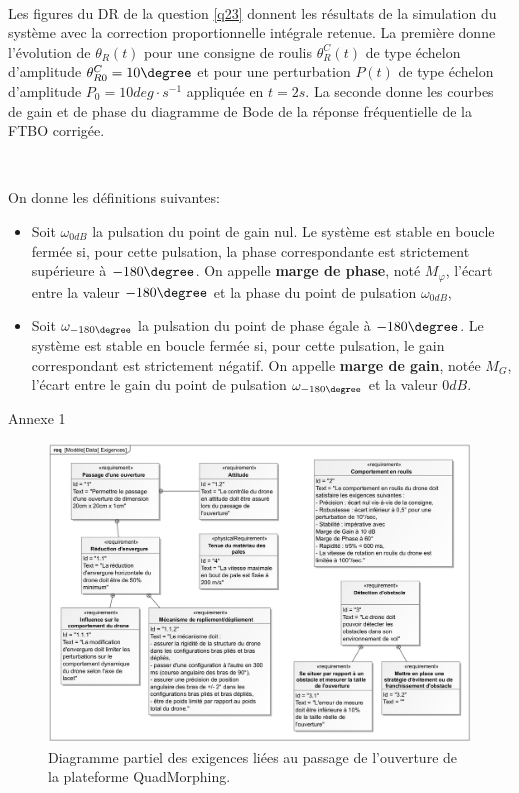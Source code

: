 ~\

Les figures du DR de la question \ref{q23} donnent les résultats de la simulation du système avec la correction proportionnelle intégrale retenue. La première donne l'évolution de $\theta_R(t)$ pour une consigne de roulis $\theta_R^C(t)$ de type échelon d'amplitude $\theta_{R0}^C=10\degree$ et pour une perturbation $P(t)$ de
type échelon d'amplitude $P_0=10deg\cdot s^{-1}$ appliquée en $t=2s$. La seconde donne les courbes de gain et de phase du diagramme de Bode de la réponse fréquentielle de la FTBO corrigée.

~\

On donne les définitions suivantes:
\begin{itemize}
 \item Soit $\omega_{0dB}$ la pulsation du point de gain nul. Le système est stable en boucle fermée si, pour cette pulsation, la phase correspondante est strictement supérieure à $-180\degree$. On appelle \textbf{marge de phase}, noté $M_\varphi$, l'écart entre la valeur $-180\degree$ et la phase du point de pulsation $\omega_{0dB}$,
 \item Soit $\omega_{-180\degree}$ la pulsation du point de phase égale à $-180\degree$. Le système est stable en boucle fermée si, pour cette pulsation, le gain correspondant est strictement négatif. On appelle \textbf{marge de gain}, notée $M_G$, l'écart entre le gain du point de pulsation $\omega_{-180\degree}$ et la valeur $0dB$. 
\end{itemize}


\newpage

\begin{center}
\Large{Annexe 1}
\end{center}

\begin{figure}[ht!]
\begin{center}
 \includegraphics[width=0.85\linewidth]{img/fig21}
\end{center}
\caption{\label{fig21} Diagramme partiel des exigences liées au passage de l’ouverture de la plateforme QuadMorphing.}
\end{figure}

